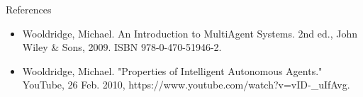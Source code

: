 \documentclass{beamer}
\begin{document}






\begin{frame}{References}
    \begin{itemize}
        \item Wooldridge, Michael. An Introduction to MultiAgent Systems. 2nd ed., John Wiley & Sons, 2009. ISBN 978-0-470-51946-2.
        \item Wooldridge, Michael. "Properties of Intelligent Autonomous Agents." YouTube, 26 Feb. 2010, https://www.youtube.com/watch?v=vID-_uIfAvg.
    \end{itemize}
\end{frame}
\end{document}
